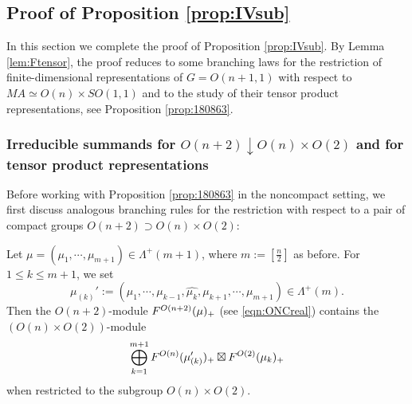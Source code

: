 \subsection{Proof of Proposition \ref{prop:IVsub}}
\label{subsec:pftrans}
In this section we complete the proof of Proposition \ref{prop:IVsub}.  
By Lemma \ref{lem:Ftensor}, 
 the proof reduces to some branching laws
 for the restriction
 of finite-dimensional representations
 of $G=O(n+1,1)$
 with respect to $M A \simeq O(n) \times SO(1,1)$
 and to the study of their tensor product representations, 
 see Proposition \ref{prop:180863}.  



\subsubsection{Irreducible summands
 for $O(n+2) \downarrow O(n) \times O(2)$
 and for tensor product representations}
Before working with Proposition \ref{prop:180863}
 in the noncompact setting, 
 we first discuss analogous branching rules 
 for the restriction with respect to a pair
 of compact groups $O(n+2) \supset O(n) \times O(2)$:
\begin{lemma}
\label{lem:1810122}
Let $\mu=(\mu_1, \cdots,\mu_{m+1}) \in \Lambda^+(m+1)$, 
 where $m:=[\frac n 2]$ as before.  
For $1\le k \le m+1$, 
 we set
\[
\mu_{(k)}':=(\mu_1, \cdots,\mu_{k-1}, \widehat{\mu_k}, \mu_{k+1}, \cdots,\mu_{m+1})
 \in \Lambda^+(m).  
\]
Then the $O(n+2)$-module $F^{{O(n+2)}}({\mu})_+$
 (see \eqref{eqn:ONCreal}) contains the 
 $(O(n) \times O(2))$-module
\[
   \bigoplus_{k=1}^{m+1} F^{{O(n)}}({\mu_{(k)}'})_+
   \boxtimes F^{{O(2)}}({\mu_k})_+
\]
 when restricted to the subgroup $O(n) \times O(2)$.  
\end{lemma}

